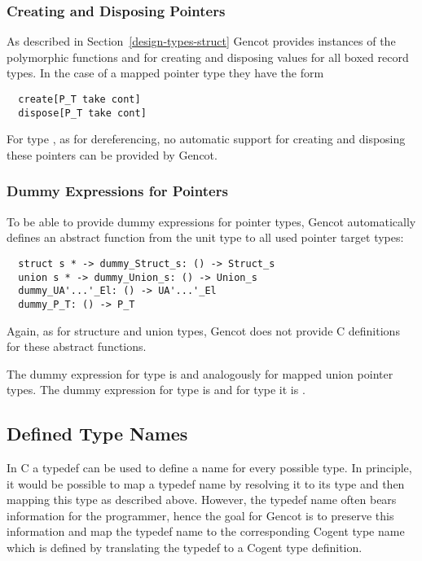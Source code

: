 \subsubsection{Creating and Disposing Pointers}

As described in Section~\ref{design-types-struct} Gencot provides instances of the polymorphic functions 
and  for creating and disposing
values for all boxed record types. In the case of a mapped pointer type  they have the form
\begin{verbatim}
  create[P_T take cont]
  dispose[P_T take cont]
\end{verbatim}
For type , as for dereferencing, no
automatic support for creating and disposing these pointers can be provided by Gencot.

\subsubsection{Dummy Expressions for Pointers}

To be able to provide dummy expressions for pointer types, Gencot automatically defines an 
abstract function from the unit type to all used pointer target types:
\begin{verbatim}
  struct s * -> dummy_Struct_s: () -> Struct_s
  union s * -> dummy_Union_s: () -> Union_s
  dummy_UA'...'_El: () -> UA'...'_El
  dummy_P_T: () -> P_T
\end{verbatim}
Again, as for structure and union types, Gencot does not 
provide C definitions for these abstract functions.

The dummy expression for type  is  and analogously
for mapped union pointer types. The dummy expression for type  is 
 and for type  it is .

\subsection{Defined Type Names}
\label{design-types-typedef}

In C a typedef can be used to define a name for every possible type. In principle, it would be possible to
map a typedef name by resolving it to its type and then mapping this type as described above. However, the
typedef name often bears information for the programmer, hence the goal for Gencot is to preserve this information
and map the typedef name to the corresponding Cogent type name which is defined by translating the typedef
to a Cogent type definition.

